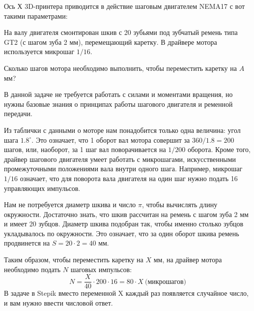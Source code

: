

Ось Х 3D-принтера приводится в действие шаговым двигателем NEMA17  с вот такими параметрами:


На валу двигателя смонтирован шкив с 20 зубьями под зубчатый ремень типа GT2 (с шагом зуба 2 мм),  перемещающий каретку. В драйвере мотора используется микрошаг $1/16$.

Сколько шагов мотора необходимо выполнить, чтобы переместить каретку на $A$ мм?

\solutionSection

В данной задаче не требуется работать с силами и моментами вращения, но нужны базовые знания о принципах работы шагового двигателя и ременной передачи.  

Из таблички с данными о моторе нам понадобится только одна величина: угол шага $1.8^\circ$.  Это означает, что 1 оборот вал мотора совершит за $360/1.8 = 200$ шагов, или, наоборот, за 1 шаг вал поворачивается на $1/200$ оборота.  Кроме того, драйвер шагового двигателя умеет работать с микрошагами, искусственными промежуточными положениями вала внутри одного шага. Например, микрошаг $1/16$ означает, что для поворота вала двигателя на один шаг нужно подать 16 управляющих импульсов. 

Нам не потребуется диаметр шкива и число $\pi$, чтобы вычислять длину окружности. Достаточно знать, что шкив рассчитан на ремень с шагом зуба 2 мм и имеет 20 зубцов. Диаметр шкива подобран так, чтобы именно столько зубцов укладывалось по окружности. Это означает, что за один оборот шкива ремень продвинется на $S = 20 \cdot 2 = 40$ мм. 

Таким образом,  чтобы переместить каретку на $X$ мм,  на драйвер мотора необходимо подать $N$ шаговых импульсов: 
$$N = \frac{X}{40} \cdot 200 \cdot 16 = 80 \cdot X \: \text{(микрошагов)}$$
В задаче в Stepik вместо переменной X каждый раз появляется случайное число, и вам нужно ввести числовой ответ. 

